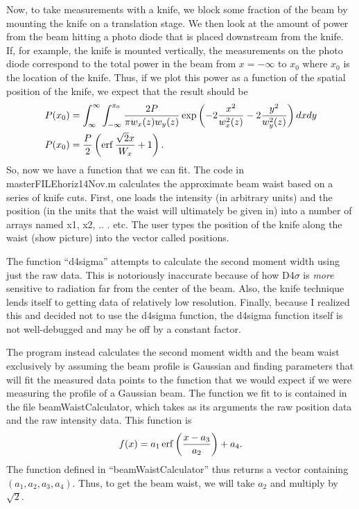 Now, to take measurements with a knife, we block some fraction of the beam by mounting the knife on a translation stage. We then look at the amount of power from the beam hitting a photo diode that is placed downstream from the knife. If, for example, the knife is mounted vertically, the measurements on the photo diode correspond to the total power in the beam from $x=-\infty$ to $x_0$ where $x_0$ is the location of the knife. Thus, if we plot this power as a function of the spatial position of the knife, we expect that the result should be 
\begin{align}
P(x_0)&=\int_{\infty}^{\infty}\int_{-\infty}^{x_0} \frac{2 P}{\pi w_x(z) w_y(z)}\exp \left(-2\frac{x^2}{w_x^2(z)}-2\frac{y^2}{w_y^2(z)}\right) dx dy\\
P(x_0)&=\frac{P}{2} \left(\operatorname{erf} \frac{\sqrt{2} x}{W_x}+1 \right).
\end{align}
So, now we have a function that we can fit. The code in masterFILEhoriz14Nov.m calculates the approximate beam waist based on a series of knife cuts. First, one loads the intensity (in arbitrary units) and the position (in the units that the waist will ultimately be given in) into a number of arrays named x1, x2, .. . etc. The user types the position of the knife along the waist (show picture) into the vector called positions. 

The function ``d4sigma'' attempts to calculate the second moment width using just the raw data. This is notoriously inaccurate because of how D4$\sigma$ is \emph{more} sensitive to radiation far from the center of the beam. Also, the knife technique lends itself to getting data of relatively low resolution. Finally, because I realized this and decided not to use the d4sigma function, the d4sigma function itself is not well-debugged and may be off by a constant factor.

The program instead calculates the second moment width and the beam waist exclusively by assuming the beam profile is Gaussian and finding parameters that will fit the measured data points to the function that we would expect if we were measuring the profile of a Gaussian beam. The function we fit to is contained in the file beamWaistCalculator, which takes as its arguments the raw position data and the raw intensity data. This function is 
\begin{equation}\label{fiterfeqn}
f(x)=a_1 \operatorname{erf} \left(\frac{x-a_3}{a_2}\right)+a_4.
\end{equation}
The function defined in ``beamWaistCalculator'' thus returns a vector containing $(a_1, a_2, a_3, a_4)$. Thus, to get the beam waist, we will take $a_2$ and multiply by $\sqrt{2}$. 

